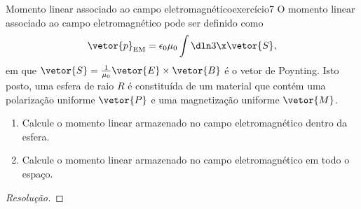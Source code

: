 \begin{exercício}{Momento linear associado ao campo eletromagnético}{exercício7}
    O momento linear associado ao campo eletromagnético pode ser definido como
    \begin{equation*}
        \vetor{p}_{\mathrm{EM}} = \epsilon_0 \mu_0 \int \dln3\x \vetor{S},
    \end{equation*}
    em que \(\vetor{S} = \frac{1}{\mu_0} \vetor{E}\times\vetor{B}\) é o vetor de Poynting. Isto posto, uma esfera de raio \(R\) é constituída de um material que contém uma polarização uniforme \(\vetor{P}\) e uma magnetização uniforme \(\vetor{M}\).
    \begin{enumerate}[label=(\alph*)]
        \item Calcule o momento linear armazenado no campo eletromagnético dentro da esfera.
        \item Calcule o momento linear armazenado no campo eletromagnético em todo o espaço.
    \end{enumerate}
\end{exercício}
\begin{proof}[Resolução]

\end{proof}
